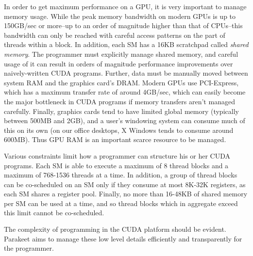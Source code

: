 \documentclass[preprint]{sigplanconf}
\begin{document}
In order to get maximum performance on a GPU, it is very important to manage
memory usage.  While the peak memory bandwidth on modern GPUs is up to 150GB/sec
or more--up to an order of magnitude higher than that of CPUs--this bandwidth
can only be reached with careful access patterns on the part of threads within a
block.  In addition, each SM has a 16KB scratchpad called {\it shared memory}.
The programmer must explicitly manage shared memory, and careful usage of it can
result in orders of magnitude performance improvements over naively-written CUDA
programs.  Further, data must be manually moved between system RAM and the
graphics card's DRAM.  Modern GPUs use PCI-Express, which has a maximum transfer
rate of around 4GB/sec, which can easily become the major bottleneck in CUDA
programs if memory transfers aren't managed carefully.  Finally, graphics cards
tend to have limited global memory (typically between 500MB and 2GB), and a
user's windowing system can consume much of this on its own (on our office
desktops, X Windows tends to consume around 600MB).  Thus GPU RAM is an
important scarce resource to be managed.

Various constraints limit how a programmer can structure his or her CUDA
programs.  Each SM is able to execute a maximum of 8 thread blocks and
a maximum of 768-1536 threads at a time.  In addition, a group of thread blocks
can be co-scheduled on an SM only if they consume at most 8K-32K registers, as
each SM shares a register pool.  Finally, no more than 16-48KB of shared
memory per SM can be used at a time, and so thread blocks which in aggregate
exceed this limit cannot be co-scheduled.

The complexity of programming in the CUDA platform should be evident.  Parakeet
aims to manage these low level details efficiently and transparently for the
programmer.

%
\end{document}
